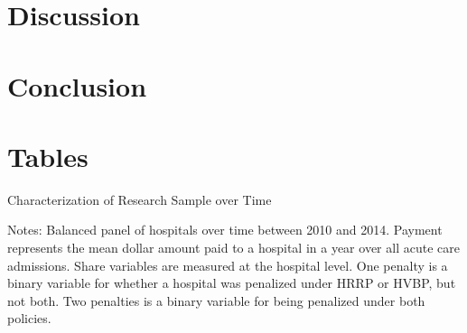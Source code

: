 \documentclass[12pt]{article}
\begin{document}
\section{Discussion}
\label{sec:Discussion}
\section{Conclusion}
\label{sec:Conclusion}


\newpage




\clearpage
\newpage
\appendix

\section{Tables}
\label{app:tables}

\newsavebox{\gfxbox}
\setlength{\captionmargin}{.5 \textwidth} \addtolength{\captionmargin}{-.5\wd\gfxbox}
\begin{table}[!h]
\centering
\caption{Characterization of Research Sample over Time}
\label{tab:summarystats}
\usebox{\gfxbox}
\par
\begin{minipage}{\wd\gfxbox}
\footnotesize
Notes: Balanced panel of hospitals over time between 2010 and 2014.  Payment represents the mean dollar amount paid to a hospital in a year over all acute care admissions.  Share variables are measured at the hospital level.  One penalty is a binary variable for whether a hospital was penalized under HRRP or HVBP, but not both.  Two penalties is a binary variable for being penalized under both policies.
\end{minipage}
\end{table}
\end{document}

